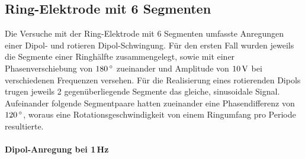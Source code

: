       \subsection*{Ring-Elektrode mit 6 Segmenten}


        Die Versuche mit der Ring-Elektrode mit 6 Segmenten umfasste Anregungen einer Dipol- und rotieren Dipol-Schwingung. Für den ersten Fall wurden jeweils die Segmente einer Ringhälfte zusammengelegt, sowie mit einer Phasenverschiebung von $\unit[180]{\degree}$ zueinander und Amplitude von $\unit[10]{V}$  bei verschiedenen Frequenzen versehen. Für die Realisierung eines rotierenden Dipols trugen jeweils 2 gegenüberliegende Segmente das gleiche, sinusoidale Signal. Aufeinander folgende Segmentpaare hatten zueinander eine Phasendifferenz von $\unit[120]{\degree}$, woraus eine Rotationsgeschwindigkeit von einem Ringumfang pro Periode resultierte.


          \paragraph{Dipol-Anregung bei 1\,Hz}

